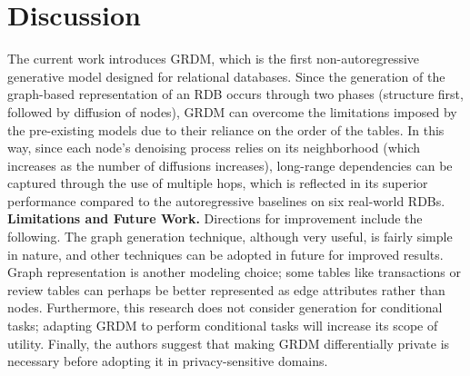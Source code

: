 \documentclass[manuscript,review]{acmart}
\begin{document}
\section{Discussion}
The current work introduces GRDM, which is the first non-autoregressive generative model designed for relational databases. Since the generation of the graph-based representation of an RDB occurs through two phases (structure first, followed by diffusion of nodes), GRDM can overcome the limitations imposed by the pre-existing models due to their reliance on the order of the tables. In this way, since each node's denoising process relies on its neighborhood (which increases as the number of diffusions increases), long-range dependencies can be captured through the use of multiple hops, which is reflected in its superior performance compared to the autoregressive baselines on six real-world RDBs.
\textbf{Limitations and Future Work.} Directions for improvement include the following. The graph generation technique, although very useful, is fairly simple in nature, and other techniques can be adopted in future for improved results. Graph representation is another modeling choice; some tables like transactions or review tables can perhaps be better represented as edge attributes rather than nodes. Furthermore, this research does not consider generation for conditional tasks; adapting GRDM to perform conditional tasks will increase its scope of utility. Finally, the authors suggest that making GRDM differentially private is necessary before adopting it in privacy-sensitive domains.



\end{document}
